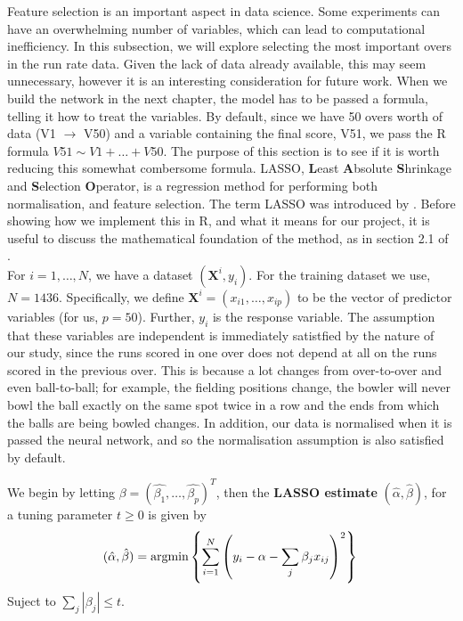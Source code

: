 Feature selection is an important aspect in data science. Some experiments can have an overwhelming number of variables, which can lead to computational inefficiency. In this subsection, we will explore selecting the most important overs in the run rate data.
Given the lack of data already available, this may seem unnecessary, however it is an interesting consideration for future work. When we build the network in the next chapter, the model has to be passed a formula, telling it how to treat the variables. By default, since we have 50 overs worth of data (V1 $\rightarrow$ V50) and a variable containing the final score, V51, we pass the R formula $V51 \sim V1 + \ldots + V50$. The purpose of this section is to see if it is worth reducing this somewhat combersome formula. 
LASSO, \textbf{L}east \textbf{A}bsolute \textbf{S}hrinkage and \textbf{S}election \textbf{O}perator, is a regression method for performing both normalisation, and feature selection. The term LASSO was introduced by \cite{tib}. Before showing how we implement this in R, and what it means for our project, it is useful to discuss the mathematical foundation of the method, as in section 2.1 of \cite{tib}. \\

For $i=1,\ldots,N$, we have a dataset $(\textbf{X}^i,y_i)$. For the training dataset we use, $N=1436$. Specifically, we define $\textbf{X}^i = (x_{i1},\ldots,x_{ip})$ to be the vector of predictor variables (for us, $p=50$). Further, $y_i$ is the response variable. The assumption that these variables are independent is immediately satistfied by the nature of our study, since the runs scored in one over does not depend at all on the runs scored in the previous over. This is because a lot changes from over-to-over and even ball-to-ball;
for example, the fielding positions change, the bowler will never bowl the ball exactly on the same spot twice in a row and the ends from which the balls are being bowled changes.  
In addition, our data is normalised when it is passed the neural network, and so the normalisation assumption is also satisfied by default. 

\begin{definition}
    We begin by letting $\beta = (\hat{\beta_1},\ldots,\hat{\beta_p})^T$, then the \textbf{LASSO estimate} $(\hat{\alpha}, \hat{\beta})$, for a tuning parameter $t \geq 0$ is given by
    \[
        (\hat{\alpha},\hat{\beta}) = \text{argmin} \left\{ \sum_{i=1}^N \left(y_i - \alpha - \sum_j \beta_j x_{ij} \right)^2 \right\} \\
    \]
    Suject to $\sum_j |\beta_j| \leq t$. 
\end{definition}

